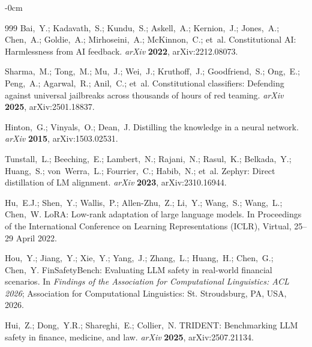 \documentclass[superintelligence,article,accept,moreauthors]{Definitions/mdpi}
\renewcommand{\hl}[1]{#1}
\begin{document}
\begin{adjustwidth}{-\extralength}{0cm}
{\begin{thebibliography}{999}
Bai,~Y.; Kadavath,~S.; Kundu,~S.; Askell,~A.; Kernion,~J.; Jones,~A.; Chen,~A.; Goldie,~A.; Mirhoseini,~A.; McKinnon,~C.; et~al.
Constitutional {AI}: Harmlessness from {AI} feedback.
{\em arXiv} {\bf 2022}, arXiv:2212.08073.


Sharma,~M.; Tong,~M.; Mu,~J.; Wei,~J.; Kruthoff,~J.; Goodfriend,~S.; Ong,~E.; Peng,~A.; Agarwal,~R.; Anil,~C.; et~al.
Constitutional classifiers: Defending against universal jailbreaks across thousands of hours of red teaming.
{\em arXiv} {\bf 2025}, arXiv:2501.18837.


Hinton,~G.; Vinyals,~O.; Dean,~J.
Distilling the knowledge in a neural network.
{\em arXiv} {\bf 2015}, arXiv:1503.02531.

Tunstall,~L.; Beeching,~E.; Lambert,~N.; Rajani,~N.; Rasul,~K.; Belkada,~Y.; Huang,~S.; von~Werra,~L.; Fourrier,~C.; Habib,~N.; et~al.
Zephyr: Direct distillation of {LM} alignment.
{\em arXiv} {\bf 2023}, arXiv:2310.16944.



Hu,~E.J.; Shen,~Y.; Wallis,~P.; Allen-Zhu,~Z.; Li,~Y.; Wang,~S.; Wang,~L.; Chen,~W.
{LoRA}: Low-rank adaptation of large language models.
In {Proceedings of the International Conference on Learning Representations (ICLR)}, \hl{Virtual, 25--29 April} 2022.




Hou,~Y.; Jiang,~Y.; Xie,~Y.; Yang,~J.; Zhang,~L.; Huang,~H.; Chen,~G.; Chen,~Y.
{FinSafetyBench}: Evaluating {LLM} safety in real-world financial scenarios.
In {\em Findings of the Association for Computational Linguistics: ACL 2026}; \hl{Association for Computational Linguistics: St. Stroudsburg, PA, USA,} 2026.

Hui,~Z.; Dong,~Y.R.; Shareghi,~E.; Collier,~N.
{TRIDENT}: Benchmarking {LLM} safety in finance, medicine, and law.
{\em arXiv} {\bf 2025}, arXiv:2507.21134.
\end{thebibliography}
}

\PublishersNote{}
\end{adjustwidth}
\end{document}
